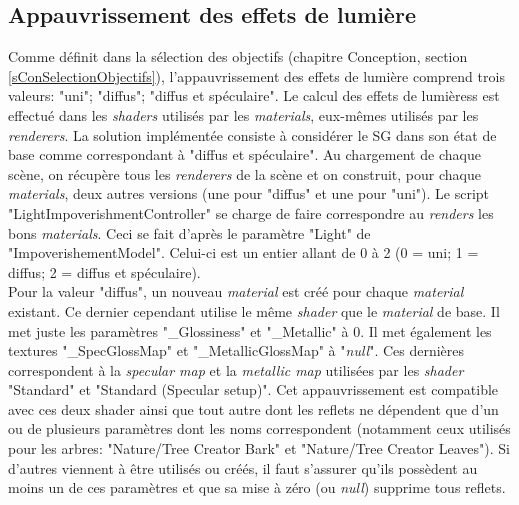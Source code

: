 		\begin{minipage}{\linewidth}
			\label{AudioEnumMaskField}
		\end{minipage}\medskip	
		
	\subsection*{Appauvrissement des effets de lumière}
		Comme définit dans la sélection des objectifs (chapitre Conception, section \ref{sConSelectionObjectifs}), l'appauvrissement des effets de lumière comprend trois valeurs: "uni"; "diffus"; "diffus et spéculaire". Le calcul des effets de lumièress est effectué dans les \textit{shaders} utilisés par les \textit{materials}, eux-mêmes utilisés par les \textit{renderers}. La solution implémentée consiste à considérer le SG dans son état de base comme correspondant à "diffus et spéculaire". Au chargement de chaque scène, on récupère tous les \textit{renderers} de la scène et on construit, pour chaque \textit{materials}, deux autres versions (une pour "diffus" et une pour "uni"). Le script "LightImpoverishmentController" se charge de faire correspondre au \textit{renders} les bons \textit{materials}. Ceci se fait d'après le paramètre "Light" de "ImpoverishementModel". Celui-ci est un entier allant de 0 à 2 (0 = uni; 1 = diffus; 2 = diffus et spéculaire).
		\\
		
		Pour la valeur "diffus", un nouveau \textit{material} est créé pour chaque \textit{material} existant. Ce dernier cependant utilise le même \textit{shader} que le \textit{material} de base. Il met juste les paramètres "\_Glossiness" et "\_Metallic" à 0. Il met également les textures "\_SpecGlossMap" et "\_MetallicGlossMap" à "\textit{null}". Ces dernières correspondent à la \textit{specular map} et la \textit{metallic map} utilisées par les \textit{shader} "Standard" et "Standard (Specular setup)". Cet appauvrissement est compatible avec ces deux shader ainsi que tout autre dont les reflets ne dépendent que d'un ou de plusieurs paramètres dont les noms correspondent (notamment ceux utilisés pour les arbres: "Nature/Tree Creator Bark" et "Nature/Tree Creator Leaves"). Si d'autres viennent à être utilisés ou créés, il faut s'assurer qu'ils possèdent au moins un de ces paramètres et que sa mise à zéro (ou \textit{null}) supprime tous reflets.
		\\
		
